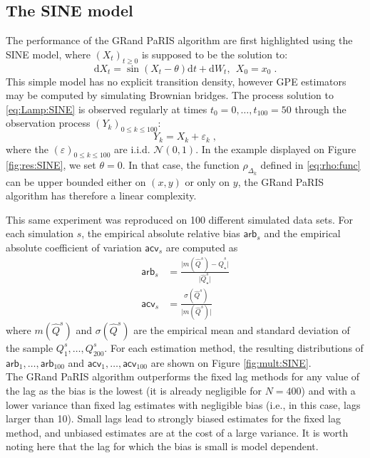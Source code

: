 \documentclass[12pt]{article}
\newcommand{\rmd}{\mathrm{d}}
\newcommand{\eqsp}{\;}
\newcommand{\1}{\mathrm{1}}
\newcommand{\hQ}{\widehat{Q}}
\begin{document}
\subsection*{The SINE model} 
The performance of the GRand PaRIS algorithm are first highlighted using the SINE model, where $(X_t)_{t\geq 0}$ is supposed to be the solution to: 
\begin{equation}
\rmd X_t = \sin \left(X_t-\theta\right)\rmd t + \rmd W_t,~~X_0=x_0\eqsp. \label{eq:Lamp:SINE}
\end{equation}
This simple model has no explicit transition density, however GPE estimators may be computed by simulating Brownian bridges.
The process solution to \eqref{eq:Lamp:SINE} is observed regularly at times $t_0=0,\ldots,t_{100}=50$ through the observation process $(Y_k)_{0\leq k \leq 100}$:
\begin{equation}
Y_k = X_k + \varepsilon_k\label{eq:obs:SINE}\eqsp,
\end{equation}
where the $(\varepsilon)_{0\leq k \leq 100}$ are i.i.d. $\mathcal{N}(0,1)$.
In the example displayed on Figure \ref{fig:res:SINE}, we set $\theta=0$.
In that case, the function $\rho_{\Delta_k}$ defined in \eqref{eq:rho:func} can be upper bounded either on $(x,y)$ or only on $y$, the GRand PaRIS algorithm has therefore a linear complexity.


This same experiment was reproduced on 100 different simulated data sets.  For each simulation $s$, the empirical absolute relative bias $\mathsf{arb}_s$ and the empirical absolute coefficient of variation $\mathsf{acv}_s$ are computed as
\begin{align}
\mathsf{arb}_s &= \frac{\vert m(\hQ^s)-\hQ^s_\star\vert }{\vert \hQ^s_\star\vert }\label{eq:emp:bias}\\
\mathsf{acv}_s&=\frac{\sigma(\hQ^s)}{\vert m(\hQ^s)\vert }\label{eq:emp:cv}
\end{align}
where $m(\hQ^s)$ and $\sigma(\hQ^s)$ are the empirical mean and standard deviation of the sample $Q_1^s,\dots,Q_{200}^s$. For each estimation method, the resulting distributions of $\mathsf{arb}_1,\dots,\mathsf{arb}_{100}$ and $\mathsf{acv}_1,\dots,\mathsf{acv}_{100}$  are shown on Figure \ref{fig:mult:SINE}.\\ 


The GRand PaRIS algorithm outperforms the fixed lag methods for any value of the lag as the bias is the lowest (it is already negligible for $N=400$) and with a lower variance than fixed lag estimates with negligible bias (i.e., in this case, lags larger than 10). Small lags lead to strongly biased estimates for the fixed lag method, and unbiased estimates are at the cost of a large variance. It is worth noting here that the lag for which the bias is small is model dependent. 
\end{document}

